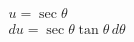 \documentclass[preview]{standalone}
\begin{document}
\begin{align*}
u=\sec\theta \\ du=\sec\theta\tan\theta \, d\theta
\end{align*}
\end{document}
